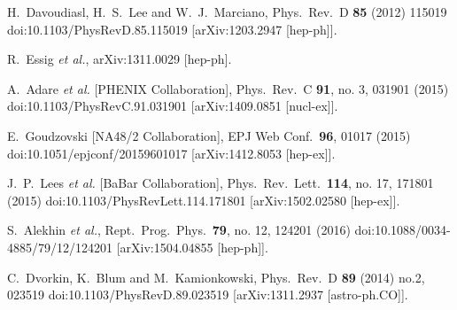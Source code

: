 \documentclass[5p,times]{elsarticle}
\begin{document}
{\begin{thebibliography}{99}
  H.~Davoudiasl, H.~S.~Lee and W.~J.~Marciano,
  Phys.\ Rev.\ D {\bf 85} (2012) 115019
  doi:10.1103/PhysRevD.85.115019
  [arXiv:1203.2947 [hep-ph]].


  R.~Essig {\it et al.},
  arXiv:1311.0029 [hep-ph].
  
  
  A.~Adare {\it et al.} [PHENIX Collaboration],
  Phys.\ Rev.\ C {\bf 91}, no. 3, 031901 (2015)
  doi:10.1103/PhysRevC.91.031901
  [arXiv:1409.0851 [nucl-ex]].

  
  E.~Goudzovski [NA48/2 Collaboration],
  EPJ Web Conf.\  {\bf 96}, 01017 (2015)
  doi:10.1051/epjconf/20159601017
  [arXiv:1412.8053 [hep-ex]].
  
  J.~P.~Lees {\it et al.} [BaBar Collaboration],
  Phys.\ Rev.\ Lett.\  {\bf 114}, no. 17, 171801 (2015)
  doi:10.1103/PhysRevLett.114.171801
  [arXiv:1502.02580 [hep-ex]].


  S.~Alekhin {\it et al.},
  Rept.\ Prog.\ Phys.\  {\bf 79}, no. 12, 124201 (2016)
  doi:10.1088/0034-4885/79/12/124201
  [arXiv:1504.04855 [hep-ph]].

  C.~Dvorkin, K.~Blum and M.~Kamionkowski,
  Phys.\ Rev.\ D {\bf 89} (2014) no.2,  023519
  doi:10.1103/PhysRevD.89.023519
  [arXiv:1311.2937 [astro-ph.CO]].




\end{thebibliography}}
\end{document}
